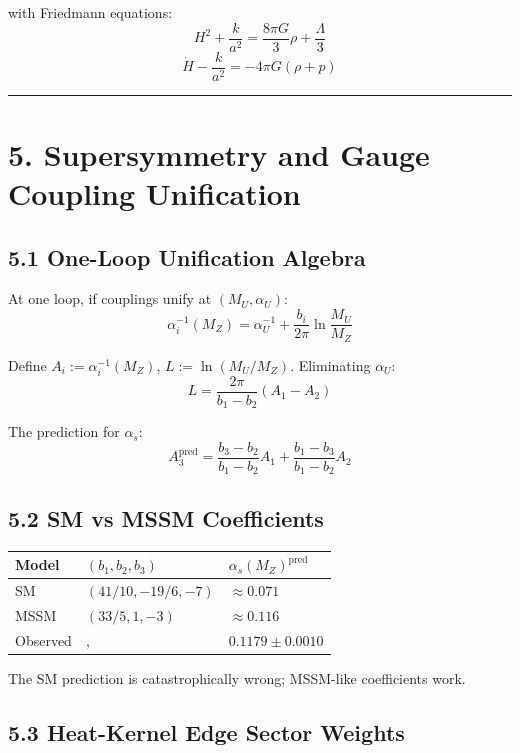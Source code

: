 with Friedmann equations: \[H^2 + \frac{k}{a^2} = \frac{8\pi G}{3}\rho + \frac{\Lambda}{3}\] \[\dot{H} - \frac{k}{a^2} = -4\pi G(\rho + p)\]

\begin{center}\rule{0.5\linewidth}{0.5pt}\end{center}

\section{5. Supersymmetry and Gauge Coupling Unification}\label{5-supersymmetry-and-gauge-coupling-unification}

\subsection{5.1 One-Loop Unification Algebra}\label{51-one-loop-unification-algebra}

At one loop, if couplings unify at \((M_U, \alpha_U)\): \[\alpha_i^{-1}(M_Z) = \alpha_U^{-1} + \frac{b_i}{2\pi}\ln\frac{M_U}{M_Z}\]

Define \(A_i := \alpha_i^{-1}(M_Z)\), \(L := \ln(M_U/M_Z)\). Eliminating \(\alpha_U\): \[L = \frac{2\pi}{b_1 - b_2}(A_1 - A_2)\]

The prediction for \(\alpha_s\): \[A_3^{\text{pred}} = \frac{b_3 - b_2}{b_1 - b_2}A_1 + \frac{b_1 - b_3}{b_1 - b_2}A_2\]

\subsection{5.2 SM vs MSSM Coefficients}\label{52-sm-vs-mssm-coefficients}

{\def\LTcaptype{none} %
\begin{longtable}[]{@{}lll@{}}
\toprule\noalign{}
Model & \((b_1, b_2, b_3)\) & \(\alpha_s(M_Z)^{\text{pred}}\) \\
\midrule\noalign{}
\endhead
\bottomrule\noalign{}
\endlastfoot
SM & \((41/10, -19/6, -7)\) & \(\approx 0.071\) \\
MSSM & \((33/5, 1, -3)\) & \(\approx 0.116\) \\
Observed & , & \(0.1179 \pm 0.0010\) \\
\end{longtable}
}

The SM prediction is catastrophically wrong; MSSM-like coefficients work.

\subsection{5.3 Heat-Kernel Edge Sector Weights}\label{53-heat-kernel-edge-sector-weights}

